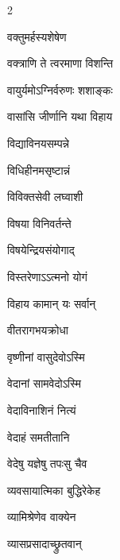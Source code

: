 \begin{multicols}{2}
\begin{indexlist}
\item वक्तुमर्हस्यशेषेण \dotfill {}
\item वक्त्राणि ते त्वरमाणा विशन्ति \dotfill {}
\item वायुर्यमोऽग्निर्वरुणः शशाङ्कः \dotfill {}
\item वासांसि जीर्णानि यथा विहाय \dotfill {}
\item विद्याविनयसम्पन्ने \dotfill {}
\item विधिहीनमसृष्टान्नं \dotfill {}
\item विविक्तसेवी लघ्वाशी \dotfill {}
\item विषया विनिवर्तन्ते \dotfill {}
\item विषयेन्द्रियसंयोगाद् \dotfill {}
\item विस्तरेणाऽऽत्मनो योगं \dotfill {}
\item विहाय कामान् यः  सर्वान् \dotfill {}
\item वीतरागभयक्रोधा \dotfill {}
\item वृष्णीनां वासुदेवोऽस्मि \dotfill {}
\item वेदानां सामवेदोऽस्मि \dotfill {}
\item वेदाविनाशिनं नित्यं \dotfill {}
\item वेदाहं समतीतानि \dotfill {}
\item वेदेषु यज्ञेषु तपःसु चैव \dotfill {}
\item व्यवसायात्मिका बुद्धिरेकेह \dotfill {}
\item व्यामिश्रेणेव वाक्येन \dotfill {}
\item व्यासप्रसादाच्छ्रुतवान् \dotfill {}
\end{indexlist}


\end{multicols}
